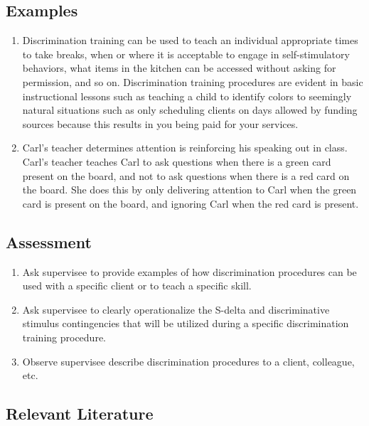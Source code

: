 \subsection{Examples}
\begin{enumerate}
\item Discrimination training can be used to teach an individual appropriate times to take breaks, when or where it is acceptable to engage in self-stimulatory behaviors, what items in the kitchen can be accessed without asking for permission, and so on. Discrimination training procedures are evident in basic instructional lessons such as teaching a child to identify colors to seemingly natural situations such as only scheduling clients on days allowed by funding sources because this results in you being paid for your services. 
\item Carl's teacher determines attention is reinforcing his speaking out in class. Carl's teacher teaches Carl to ask questions when there is a green card present on the board, and not to ask questions when there is a red card on the board. She does this by only delivering attention to Carl when the green card is present on the board, and ignoring Carl when the red card is present. 
\end{enumerate}
%
\subsection{Assessment}
\begin{enumerate}
\item Ask supervisee to provide examples of how discrimination procedures can be used with a specific client or to teach a specific skill.
\item Ask supervisee to clearly operationalize the S-delta and discriminative stimulus contingencies that will be utilized during a specific discrimination training procedure.
\item Observe supervisee describe discrimination procedures to a client, colleague, etc.
\end{enumerate}
%
\subsection{Relevant Literature}
\begin{refsection}
\nocite{cooper2007applied,
        malott2003principles,
        taylor2014discrimination}
\printbibliography[heading=none]
\end{refsection}
%
